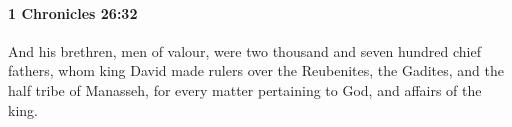 
		\paragraph{1 Chronicles 26:32} %
			\label{1CHRONICLES-26-32}

			And his brethren, men of valour, were two thousand and seven hundred chief fathers, whom king David made rulers over the Reubenites, the Gadites, and the half tribe of Manasseh, for every matter pertaining to God, and affairs of the king.

